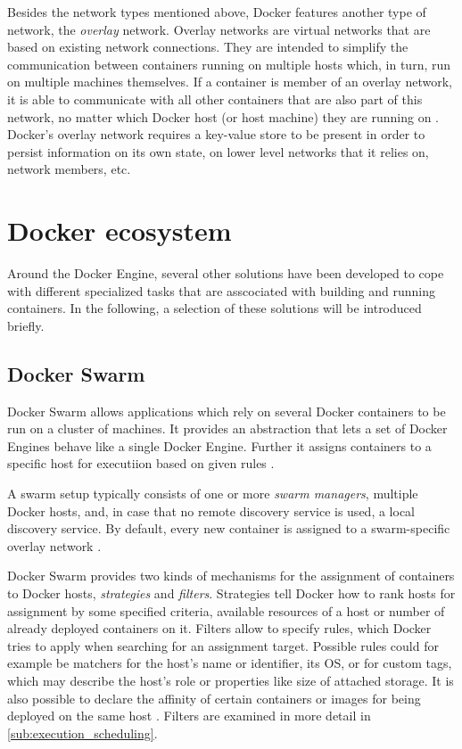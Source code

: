     Besides the network types mentioned above, Docker features another type of network, the \emph{overlay} network. Overlay networks are virtual networks that are based on existing network connections. They are intended to simplify the communication between containers running on multiple hosts which, in turn, run on multiple machines themselves. If a container is member of an overlay network, it is able to communicate with all other containers that are also part of this network, no matter which Docker host (or host machine) they are running on \cite{Docker2016Docker}.
    Docker's overlay network requires a key-value store to be present in order to persist information on its own state, \eg on lower level networks that it relies on, network members, etc.


\section{Docker ecosystem} %
\label{sec:docker_ecosystem}

   Around the Docker Engine, several other solutions have been developed to cope with different specialized tasks that are asscociated with building and running containers. In the following, a selection of these solutions will be introduced briefly.

  \subsection{Docker Swarm} %
  \label{sub:docker_swarm}
    Docker Swarm allows applications which rely on several Docker containers to be run on a cluster of machines. It provides an abstraction that lets a set of Docker Engines behave like a single Docker Engine. Further it assigns containers to a specific host for executiion based on given rules \cite{Docker2016Dockera}.

    A swarm setup typically consists of one or more \emph{swarm managers}, multiple Docker hosts, and, in case that no remote discovery service is used, a local discovery service. By default, every new container is assigned to a swarm-specific overlay network \cite{Docker2016Docker}.

    Docker Swarm provides two kinds of mechanisms for the assignment of containers to Docker hosts, \emph{strategies} and \emph{filters}. Strategies tell Docker how to rank hosts for assignment by some specified criteria, \eg available resources of a host or number of already deployed containers on it.
    Filters allow to specify rules, which Docker tries to apply when searching for an assignment target. Possible rules could for example be matchers for the host's name or identifier, its \ac{OS}, or for custom tags, which may describe the host's role or properties like size of attached storage. It is also possible to declare the affinity of certain containers or images for being deployed on the same host \cite{Docker2016Docker}. Filters are examined in more detail in \ref{sub:execution_scheduling}.

